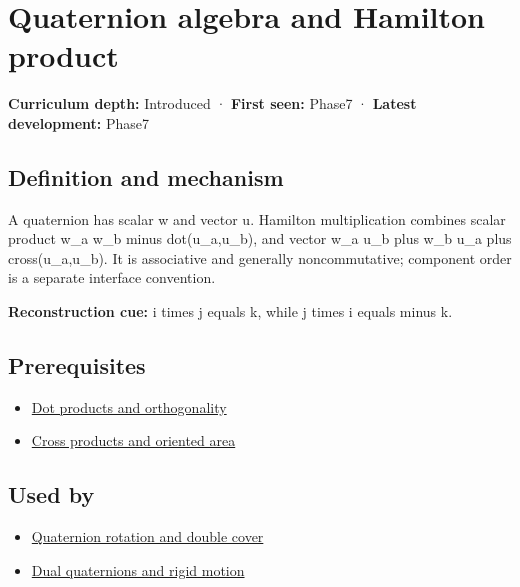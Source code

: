 \hypertarget{appendix-965d9260eeab}{}\label{referencestart:appendix-965d9260eeab}
\section{Quaternion algebra and Hamilton product}\label{appendix-965d9260eeab-quaternion-algebra-and-hamilton-product}

\textbf{Curriculum depth:} Introduced · \textbf{First seen:} Phase7 · \textbf{Latest development:} Phase7

\subsection{Definition and mechanism}\label{appendix-965d9260eeab-definition-and-mechanism}

A quaternion has scalar w and vector u. Hamilton multiplication combines scalar product w\_a w\_b minus dot(u\_a,u\_b), and vector w\_a u\_b plus w\_b u\_a plus cross(u\_a,u\_b). It is associative and generally noncommutative; component order is a separate interface convention.

\textbf{Reconstruction cue:} i times j equals k, while j times i equals minus k.

\subsection{Prerequisites}\label{appendix-965d9260eeab-prerequisites}

\begin{itemize}
\tightlist
\item
  \hyperref[appendix-8bc4e8fc547c]{Dot products and orthogonality}
\item
  \hyperref[appendix-2391db8052b1]{Cross products and oriented area}
\end{itemize}

\subsection{Used by}\label{appendix-965d9260eeab-used-by}

\begin{itemize}
\tightlist
\item
  \hyperref[appendix-8e61ab68f6b2]{Quaternion rotation and double cover}
\item
  \hyperref[appendix-d1ea57347893]{Dual quaternions and rigid motion}
\end{itemize}


